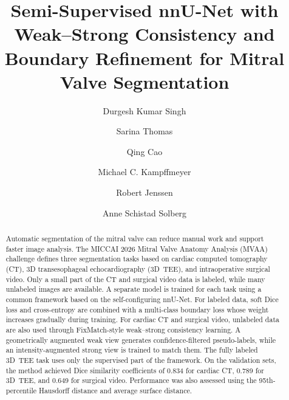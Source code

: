 \documentclass[runningheads]{llncs}
\begin{document}
%
\title{Semi-Supervised nnU-Net with Weak--Strong Consistency and
Boundary Refinement for Mitral Valve Segmentation}
%
\author{Durgesh Kumar Singh \and
Sarina Thomas \and
Qing Cao \and
Michael C. Kampffmeyer \and
Robert Jenssen \and
Anne Schistad Solberg}
%
%
\maketitle
%
\begin{abstract}
Automatic segmentation of the mitral valve can reduce manual work and
support faster image analysis. The MICCAI 2026 Mitral Valve Anatomy
Analysis (MVAA) challenge defines three segmentation tasks based on
cardiac computed tomography (CT), 3D transesophageal echocardiography
(3D~TEE), and intraoperative surgical video. Only a small part of the
CT and surgical video data is labeled, while many unlabeled images are
available. A separate model is trained for each task using a common
framework based on the self-configuring nnU-Net. For labeled data, soft
Dice loss and cross-entropy are combined with a multi-class boundary
loss whose weight increases gradually during training. For cardiac CT
and surgical video, unlabeled data are also used through FixMatch-style
weak--strong consistency learning. A geometrically augmented weak view
generates confidence-filtered pseudo-labels, while an
intensity-augmented strong view is trained to match them. The fully
labeled 3D~TEE task uses only the supervised part of the framework. On
the validation sets, the method achieved Dice similarity coefficients
of 0.834 for cardiac CT, 0.789 for 3D~TEE, and 0.649 for surgical
video. Performance was also assessed using the 95th-percentile
Hausdorff distance and average surface distance.

\end{abstract}
%
\end{document}
